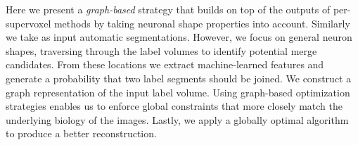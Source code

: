 Here we present a \textit{graph-based} strategy that builds on top of the outputs of per-supervoxel methods by taking neuronal shape properties into account. 
Similarly we take as input automatic segmentations. 
However, we focus on general neuron shapes, traversing through the label volumes to identify potential merge candidates. 
From these locations we extract machine-learned features and generate a probability that two label segments should be joined. 
We construct a graph representation of the input label volume. 
Using graph-based optimization strategies enables us to enforce global constraints that more closely match the underlying biology of the images.
Lastly, we apply a globally optimal algorithm to produce a better reconstruction.

